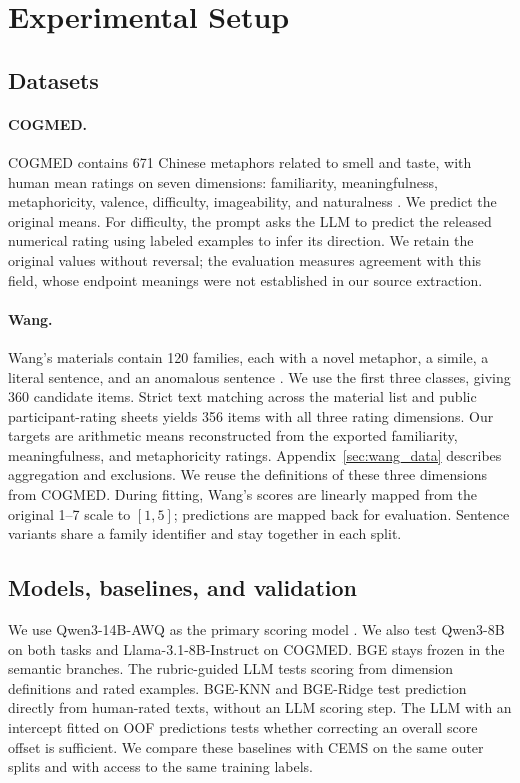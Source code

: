 \section{Experimental Setup}

\subsection{Datasets}

\paragraph{COGMED.} COGMED contains 671 Chinese metaphors related to smell and taste, with human mean ratings on seven dimensions: familiarity, meaningfulness, metaphoricity, valence, difficulty, imageability, and naturalness \citep{huang2024cogmed}. We predict the original means. For difficulty, the prompt asks the LLM to predict the released numerical rating using labeled examples to infer its direction. We retain the original values without reversal; the evaluation measures agreement with this field, whose endpoint meanings were not established in our source extraction.

\paragraph{Wang.} Wang's materials contain 120 families, each with a novel metaphor, a simile, a literal sentence, and an anomalous sentence \citep{wang2022normed}. We use the first three classes, giving 360 candidate items. Strict text matching across the material list and public participant-rating sheets yields 356 items with all three rating dimensions. Our targets are arithmetic means reconstructed from the exported familiarity, meaningfulness, and metaphoricity ratings. Appendix~\ref{sec:wang_data} describes aggregation and exclusions. We reuse the definitions of these three dimensions from COGMED. During fitting, Wang's scores are linearly mapped from the original 1--7 scale to $[1,5]$; predictions are mapped back for evaluation. Sentence variants share a family identifier and stay together in each split.

\subsection{Models, baselines, and validation}

We use Qwen3-14B-AWQ as the primary scoring model \citep{yang2025qwen3}. We also test Qwen3-8B on both tasks and Llama-3.1-8B-Instruct on COGMED. BGE stays frozen in the semantic branches. The rubric-guided LLM tests scoring from dimension definitions and rated examples. BGE-KNN and BGE-Ridge test prediction directly from human-rated texts, without an LLM scoring step. The LLM with an intercept fitted on OOF predictions tests whether correcting an overall score offset is sufficient. We compare these baselines with CEMS on the same outer splits and with access to the same training labels.

